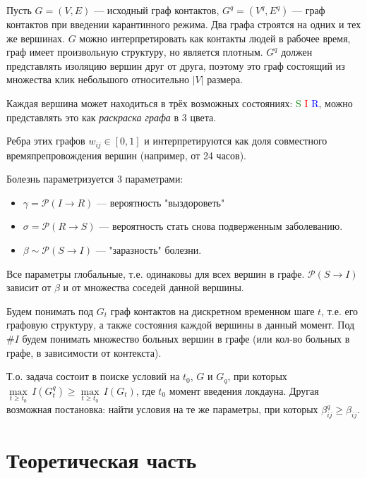 	Пусть $ G = (V, E) $ --- исходный граф контактов, $ G^q = (V^q, E^q) $ --- граф контактов при введении карантинного режима. Два графа строятся на одних и тех же вершинах. $ G $ можно интерпретировать как контакты людей в рабочее время, граф имеет произвольную структуру, но является плотным. $G^q$ должен представлять изоляцию вершин друг от друга, поэтому это граф состоящий из множества клик небольшого относительно $\lvert V \rvert$ размера.
	
	Каждая вершина может находиться в трёх возможных состояниях: \textcolor{green}{S} \textcolor{red}{I} \textcolor{blue}{R}, можно представлять это как \textit{раскраска графа} в 3 цвета. 
	
	Ребра этих графов $w_{ij} \in [0, 1]$ и интерпретируются как доля совместного времяпрепровождения вершин (например, от 24 часов).
	
	Болезнь параметризуется 3 параметрами:
	
	\begin{itemize}
		\item $\gamma = \mathcal{P}(I \rightarrow R)$ --- вероятность "выздороветь"
		\item $\sigma = \mathcal{P}(R \rightarrow S)$ --- вероятность стать снова подверженным заболеванию.
		\item $\beta \sim \mathcal{P}(S \rightarrow I)$ --- "заразность" болезни.
	\end{itemize}

	Все параметры глобальные, т.е. одинаковы для всех вершин в графе. $\mathcal{P}(S \rightarrow I)$ зависит от $\beta$ и от множества соседей данной вершины.
	
	Будем понимать под $ G_t $ граф контактов на дискретном временном шаге $ t $, т.е. его графовую структуру, а также состояния каждой вершины в данный момент. Под $ \# I $ будем понимать множество больных вершин в графе (или кол-во больных в графе, в зависимости от контекста). 
	
	Т.о. задача состоит в поиске условий на $ t_0 $, $ G $ и $ G_q $, при которых $ \underset{t \ge t_0}{\max} \, I(G^q_t) \ge \underset{t \ge t_0}{\max} \, I(G_t) $, где $ t_0 $ момент введения локдауна. Другая возможная постановка: найти условия на те же параметры, при которых $ \beta_{ij}^q \ge \beta_{ij} $.
	
	\section*{Теоретическая часть}
	
